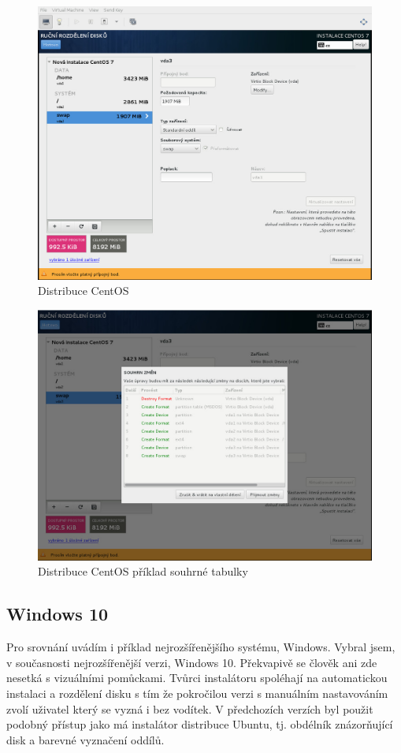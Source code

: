 \documentclass[a4paper]{article}
\begin{document}
\begin{figure}
\label{fig:centos1}
\caption{Distribuce CentOS}
\centering
\includegraphics[width=.8\columnwidth]{pics/centos1.jpg}
\end{figure}

\begin{figure}
\label{fig:centos2}
\caption{Distribuce CentOS příklad souhrné tabulky}
\centering
\includegraphics[width=.8\columnwidth]{pics/centos3.jpg}
\end{figure}

\subsection{Windows 10}

Pro srovnání uvádím i příklad nejrozšířenějšího systému, Windows. Vybral jsem, v současnosti nejrozšířenější verzi, Windows 10. Překvapivě se člověk ani zde nesetká s vizuálními pomůckami.
Tvůrci instalátoru spoléhají na automatickou instalaci a rozdělení disku s tím že pokročilou verzi s manuálním nastavováním zvolí uživatel který se vyzná i bez vodítek. V předchozích verzích
byl použit podobný přístup jako má instalátor distribuce Ubuntu, tj. obdélník znázorňující disk a barevné vyznačení oddílů.
\end{document}
